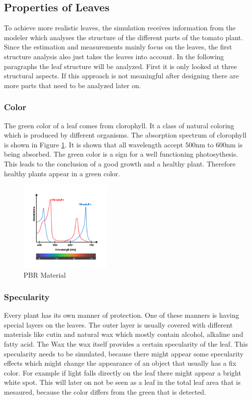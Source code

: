 
\graphicspath{{Pictures/}}

\subsection{Properties of Leaves}

To achieve more realistic leaves, the simulation receives information from the modeler which analyses the structure of the different parts of the tomato plant. Since the estimation and measurements mainly focus on the leaves, the first structure analysis also just takes the leaves into account.
In the following paragraphs the leaf structure will be analyzed. First it is only looked at three structural aspects. If this approach is not meaningful after designing there are more parts that need to be analyzed later on.

\subsubsection{Color}
The green color of a leaf comes from clorophyll. It a class of natural coloring which is produced by different organisms. 
The absorption spectrum of clorophyll is shown in Figure \ref{clorophyll}. It is shown that all wavelength accept 500nm to 600nm is being absorbed. The green color is a sign for a well functioning  photosythesis. This leads to the conclusion of a good growth and a healthy plant. Therefore healthy plants appear in a green color.

\begin{figure}[h]
	\centering
	\includegraphics[width=0.4\textwidth]{wavelength.png}
	\caption{PBR Material}
	\label{clorophyll}
\end{figure}

\subsubsection{Specularity}
Every plant has its own manner of protection. One of these manners is having special layers on the leaves. The outer layer is usually covered with different materials like cutin and natural wax which mostly contain  alcohol, alkaline and fatty acid. The Wax the wax itself provides a certain specularity of the leaf. This specularity needs to be simulated, because there might appear some specularity effects which might change the appearance of an object that usually has a fix color. For example if light falls directly on the leaf there might appear a bright white spot. This will later on not be seen as a leaf in the total leaf area that is mesaured, because the color differs from the green that is detected.

